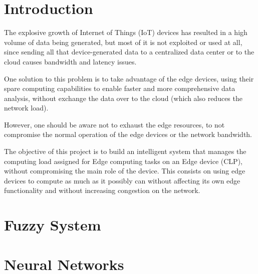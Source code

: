 \documentclass[10pt]{article}
\begin{document}
\maketitle


\section{Introduction}
\normalfont
The explosive growth of Internet of Things (IoT) devices has resulted in a high volume of data being generated, but most of it is not exploited or used at all, since sending all that device-generated data to a centralized data center or to the cloud causes bandwidth and latency issues.

One solution to this problem is to take advantage of the edge devices, using their spare computing capabilities to enable faster and more comprehensive data analysis, without exchange the data over to the cloud (which also reduces the network load).

However, one should be aware not to exhaust the edge resources, to not compromise the normal operation of the edge devices or the network bandwidth.

The objective of this project is to build an intelligent system that manages the computing load assigned for Edge computing tasks on an Edge device (CLP), without compromising the main role of the device. This consists on using edge devices to compute as much as it possibly can without affecting its own edge functionality and without increasing congestion on the network.

\section{Fuzzy System}
\label{sec:fuzzy_system}


\newpage

\section{Neural Networks}

\end{document}
